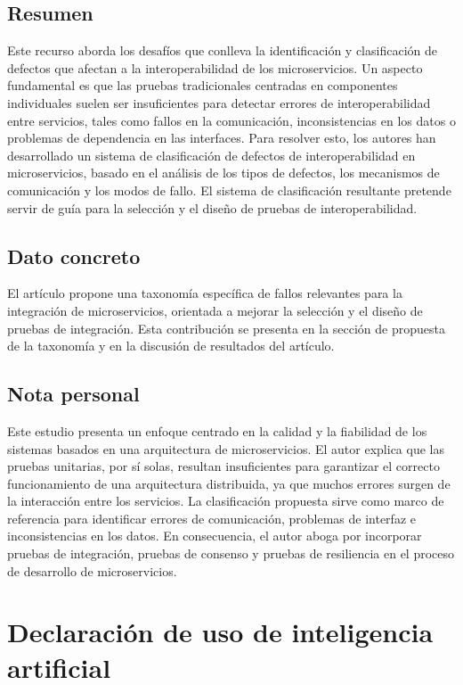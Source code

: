 \documentclass[11pt]{article}
\begin{document}
\subsection*{Resumen}
Este recurso aborda los desafíos que conlleva la identificación y clasificación de defectos que afectan a la interoperabilidad de los microservicios. Un aspecto fundamental es que las pruebas tradicionales centradas en componentes individuales suelen ser insuficientes para detectar errores de interoperabilidad entre servicios, tales como fallos en la comunicación, inconsistencias en los datos o problemas de dependencia en las interfaces. Para resolver esto, los autores han desarrollado un sistema de clasificación de defectos de interoperabilidad en microservicios, basado en el análisis de los tipos de defectos, los mecanismos de comunicación y los modos de fallo. El sistema de clasificación resultante pretende servir de guía para la selección y el diseño de pruebas de interoperabilidad.

\subsection*{Dato concreto}
El artículo propone una taxonomía específica de fallos relevantes para la integración de microservicios, orientada a mejorar la selección y el diseño de pruebas de integración. Esta contribución se presenta en la sección de propuesta de la taxonomía y en la discusión de resultados del artículo.

\subsection*{Nota personal}
Este estudio presenta un enfoque centrado en la calidad y la fiabilidad de los sistemas basados en una arquitectura de microservicios. El autor explica que las pruebas unitarias, por sí solas, resultan insuficientes para garantizar el correcto funcionamiento de una arquitectura distribuida, ya que muchos errores surgen de la interacción entre los servicios. La clasificación propuesta sirve como marco de referencia para identificar errores de comunicación, problemas de interfaz e inconsistencias en los datos. En consecuencia, el autor aboga por incorporar pruebas de integración, pruebas de consenso y pruebas de resiliencia en el proceso de desarrollo de microservicios.

\newpage

\section*{Declaración de uso de inteligencia artificial}
\end{document}
